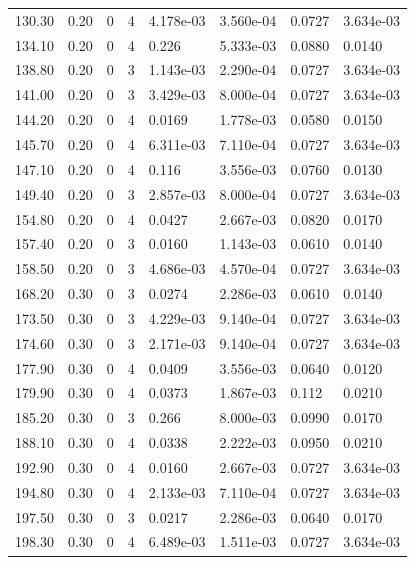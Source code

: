 \documentclass[preview]{standalone}
\begin{document}
{{{\begin{tabular}{L{1.2cm}C{1.2cm} C{0.3cm}C{0.5cm} C{1.4cm}C{1.4cm} C{1.4cm}C{1.4cm}}
  130.30  &  0.20  & 0     &  4 &  4.178e-03  & 3.560e-04  & 0.0727 &  3.634e-03   \\ 
  134.10  &  0.20  & 0     &  4 &  0.226  & 5.333e-03  & 0.0880 &  0.0140   \\ 
  138.80  &  0.20  & 0     &  3 &  1.143e-03  & 2.290e-04  & 0.0727 &  3.634e-03   \\ 
  141.00  &  0.20  & 0     &  3 &  3.429e-03  & 8.000e-04  & 0.0727 &  3.634e-03   \\ 
  144.20  &  0.20  & 0     &  4 &  0.0169  & 1.778e-03  & 0.0580 &  0.0150   \\ 
  145.70  &  0.20  & 0     &  4 &  6.311e-03  & 7.110e-04  & 0.0727 &  3.634e-03   \\ 
  147.10  &  0.20  & 0     &  4 &  0.116  & 3.556e-03  & 0.0760 &  0.0130   \\ 
  149.40  &  0.20  & 0     &  3 &  2.857e-03  & 8.000e-04  & 0.0727 &  3.634e-03   \\ 
  154.80  &  0.20  & 0     &  4 &  0.0427  & 2.667e-03  & 0.0820 &  0.0170   \\ 
  157.40  &  0.20  & 0     &  3 &  0.0160  & 1.143e-03  & 0.0610 &  0.0140   \\ 
  158.50  &  0.20  & 0     &  3 &  4.686e-03  & 4.570e-04  & 0.0727 &  3.634e-03   \\ 
  168.20  &  0.30  & 0     &  3 &  0.0274  & 2.286e-03  & 0.0610 &  0.0140   \\ 
  173.50  &  0.30  & 0     &  3 &  4.229e-03  & 9.140e-04  & 0.0727 &  3.634e-03   \\ 
  174.60  &  0.30  & 0     &  3 &  2.171e-03  & 9.140e-04  & 0.0727 &  3.634e-03   \\ 
  177.90  &  0.30  & 0     &  4 &  0.0409  & 3.556e-03  & 0.0640 &  0.0120   \\ 
  179.90  &  0.30  & 0     &  4 &  0.0373  & 1.867e-03  & 0.112 &  0.0210   \\ 
  185.20  &  0.30  & 0     &  3 &  0.266  & 8.000e-03  & 0.0990 &  0.0170   \\ 
  188.10  &  0.30  & 0     &  4 &  0.0338  & 2.222e-03  & 0.0950 &  0.0210   \\ 
  192.90  &  0.30  & 0     &  4 &  0.0160  & 2.667e-03  & 0.0727 &  3.634e-03   \\ 
  194.80  &  0.30  & 0     &  4 &  2.133e-03  & 7.110e-04  & 0.0727 &  3.634e-03   \\ 
  197.50  &  0.30  & 0     &  3 &  0.0217  & 2.286e-03  & 0.0640 &  0.0170   \\ 
  198.30  &  0.30  & 0     &  4 &  6.489e-03  & 1.511e-03  & 0.0727 &  3.634e-03   \\ 

\end{tabular}}}}
\end{document}
